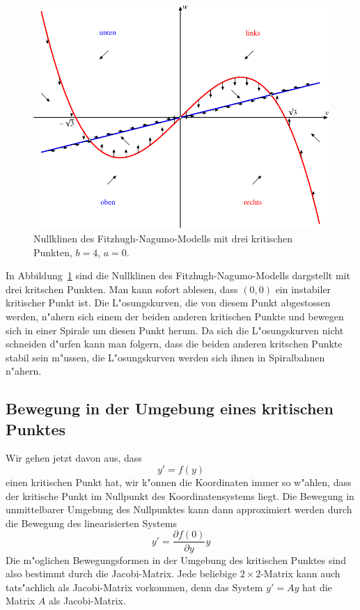 \begin{beispiel}
\begin{figure}
\centering
\includegraphics{chapters/images/nullklinen-6.pdf}
\caption{Nullklinen des Fitzhugh-Nagumo-Modells mit drei kritischen Punkten,
$b=4$, $a=0$.
\label{geometrie:nullklinen-fh-2}}
\end{figure}
In Abbildung~\ref{geometrie:nullklinen-fh-2} sind die Nullklinen des
Fitzhugh-Nagumo-Modells dargstellt mit drei kritschen Punkten.
Man kann sofort ablesen, dass $(0,0)$ ein instabiler kritischer Punkt ist.
Die L"osungskurven, die von diesem Punkt abgestossen werden, n"ahern sich
einem der beiden anderen kritischen Punkte und bewegen sich
in einer Spirale um diesen Punkt herum.
Da sich die L"osungskurven nicht schneiden d"urfen kann man folgern,
dass die beiden anderen kritschen Punkte stabil sein m"ussen,
die L"osungskurven werden sich ihnen in Spiralbahnen n"ahern.
\label{geometrie:fh-diskussion}
\end{beispiel}

%
%
\subsection{Bewegung in der Umgebung eines kritischen Punktes
\label{geometrie:umgebung-kritisch}}
Wir gehen jetzt davon aus, dass 
\[
y'=f(y)
\]
einen kritischen Punkt hat, wir k"onnen die Koordinaten immer so w"ahlen,
dass der kritische Punkt im Nullpunkt des Koordinatensystems liegt.
Die Bewegung in unmittelbarer Umgebung des Nullpunktes kann dann approximiert
werden durch die Bewegung des linearisierten Systems
\[
y'=\frac{\partial f(0)}{\partial y}y
\]
Die m"oglichen Bewegungsformen in der Umgebung des kritischen Punktes
sind also bestimmt durch die Jacobi-Matrix.
Jede beliebige $2\times 2$-Matrix kann auch tats"achlich als Jacobi-Matrix
vorkommen, denn das System
$
y'=Ay
$
hat die Matrix $A$ als Jacobi-Matrix.

